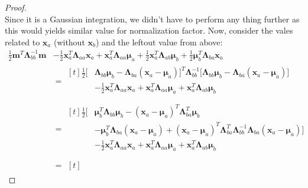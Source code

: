 \begin{proof}
\begin{equation*}
    \end{equation*}
    Since it is a Gaussian integration, we didn't have to perform any thing further as this would yields similar value for normalization factor. Now, consider the vales related to $\boldsymbol x_a$ (without $\boldsymbol x_b$) and the leftout value from above:
    \begin{equation*}
    \begin{aligned}
        \frac{1}{2}\boldsymbol m^T\boldsymbol\Lambda_{bb}^{-1}\boldsymbol m &- \frac{1}{2}\boldsymbol x_a^T\boldsymbol \Lambda_{aa}\boldsymbol x_a + \boldsymbol x_a^T\boldsymbol \Lambda_{aa}\boldsymbol \mu_a + \frac{1}{2}\boldsymbol x_a^T\boldsymbol \Lambda_{ab}\boldsymbol \mu_b + \frac{1}{2}\boldsymbol \mu_b^T\boldsymbol \Lambda_{ba}\boldsymbol x_a \\
        &= \begin{aligned}[t]
            \frac{1}{2}\Big[  &\boldsymbol \Lambda_{bb}\boldsymbol \mu_b - \boldsymbol \Lambda_{ba}(\boldsymbol x_a - \boldsymbol \mu_a) \Big]^T\boldsymbol\Lambda_{bb}^{-1}\Big[  \boldsymbol \Lambda_{bb}\boldsymbol \mu_b - \boldsymbol \Lambda_{ba}(\boldsymbol x_a - \boldsymbol \mu_a) \Big] \\
            &- \frac{1}{2}\boldsymbol x_a^T\boldsymbol \Lambda_{aa}\boldsymbol x_a + \boldsymbol x_a^T\boldsymbol \Lambda_{aa}\boldsymbol \mu_a + \boldsymbol x_a^T\boldsymbol \Lambda_{ab}\boldsymbol \mu_b \\
        \end{aligned} \\ 
        &= \begin{aligned}[t]
            \frac{1}{2}\Big[&\boldsymbol \mu_b^T\boldsymbol \Lambda_{bb}\boldsymbol \mu_b - (\boldsymbol x_a - \boldsymbol \mu_a)^T\boldsymbol \Lambda_{ba}^T\boldsymbol \mu_b  \\
            &-\boldsymbol \mu_b^T\boldsymbol \Lambda_{ba}(\boldsymbol x_a - \boldsymbol \mu_a) + (\boldsymbol x_a - \boldsymbol \mu_a)^T\boldsymbol \Lambda_{ba}^T\boldsymbol\Lambda_{bb}^{-1}\boldsymbol \Lambda_{ba}(\boldsymbol x_a - \boldsymbol \mu_a)\Big]  \\
            &- \frac{1}{2}\boldsymbol x_a^T\boldsymbol \Lambda_{aa}\boldsymbol x_a + \boldsymbol x_a^T\boldsymbol \Lambda_{aa}\boldsymbol \mu_a + \boldsymbol x_a^T\boldsymbol \Lambda_{ab}\boldsymbol \mu_b \\
        \end{aligned} \\ 
        &= \begin{aligned}[t]

\end{aligned}
\end{aligned}
\end{equation*}
\end{proof}
